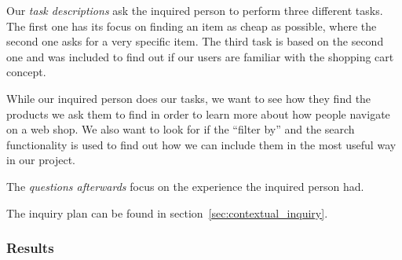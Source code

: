 Our \textit{task descriptions} ask the inquired person to perform three different tasks. The first one has its focus on finding an item as cheap as possible, where the second one asks for a very specific item. The third task is based on the second one and was included to find out if our users are familiar with the shopping cart concept. 

While our inquired person does our tasks, we want to see how they find the products we ask them to find in order to learn more about how people navigate on a web shop. We also want to look for if the ``filter by'' and the search functionality is used to find out how we can include them in the most useful way in our project. 

The \textit{questions afterwards} focus on the experience the inquired person had.

The inquiry plan can be found in section~\ref{sec:contextual_inquiry}.

\subsubsection{Results}


